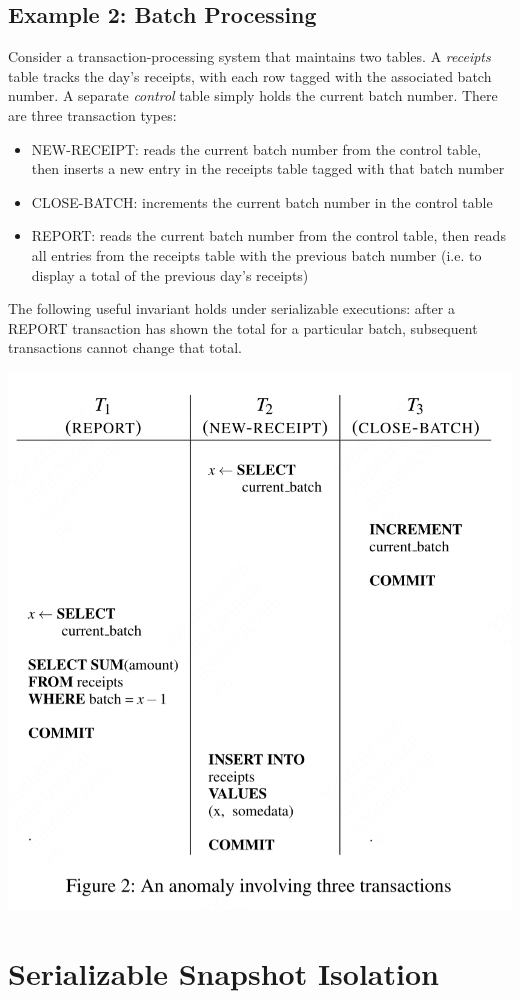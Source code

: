\documentclass[11pt]{article}
\begin{document}
\subsection{Example 2: Batch Processing}
\label{sec:org71f2d2d}
Consider a transaction-processing system that maintains two tables. A \emph{receipts} table tracks the day’s
receipts, with each row tagged with the associated batch number. A separate \emph{control} table simply holds
the current batch number. There are three transaction types:
\begin{itemize}
\item NEW-RECEIPT: reads the current batch number from the control table, then inserts a new entry in the
receipts table tagged with that batch number
\item CLOSE-BATCH: increments the current batch number in the control table
\item REPORT: reads the current batch number from the control table, then reads all entries from the
receipts table with the previous batch number (i.e. to display a total of the previous day’s
receipts)
\end{itemize}


The following useful invariant holds under serializable executions: after a REPORT transaction has
shown the total for a particular batch, subsequent transactions cannot change that total.
\begin{center}
\includegraphics[width=.5\textwidth]{../../images/papers/74.png}
\label{2}
\end{center}
\section{Serializable Snapshot Isolation}
\label{sec:org3ccf8ec}
\end{document}

